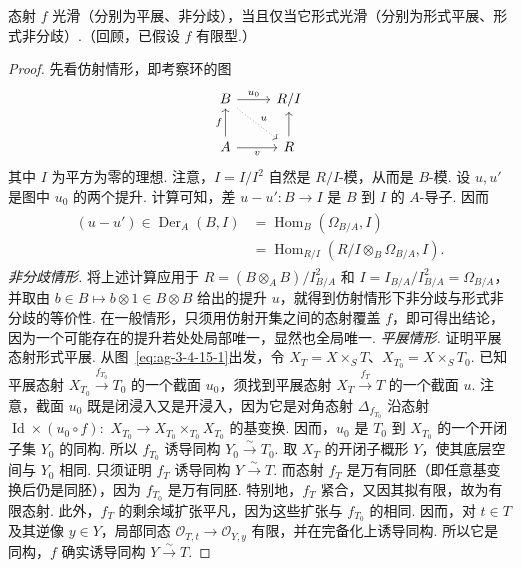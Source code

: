\begin{theorem}\label{item:ag-3-4-16}
态射 $f$ 光滑（分别为平展、非分歧），当且仅当它形式光滑（分别为形式平展、形式非分歧）.（回顾，已假设 $f$ 有限型.）
\end{theorem}
\begin{proof}
先看仿射情形，即考察环的图
\begin{align*}
\begin{tikzcd}[ampersand replacement=\&]
B\arrow[r,"u_0"]\arrow[dr,dotted,"u"] \& R/I\\
A\arrow[u,"f"]\arrow[r,"v"'] \& R\arrow[u]
\end{tikzcd}
\end{align*}
其中 $I$ 为平方为零的理想. 注意，$I=I/I^2$ 自然是 $R/I$-模，从而是 $B$-模. 设 $u,u'$ 是图中 $u_0$ 的两个提升. 计算可知，差 $u-u':B\longrightarrow I$ 是 $B$ 到 $I$ 的 $A$-导子. 因而
\begin{align}
\begin{aligned}
(u-u')\in\operatorname{Der}_A(B,I)&=\operatorname{Hom}_B(\Omega_{B/A},I)\\
&=\operatorname{Hom}_{R/I}(R/I\otimes_B\Omega_{B/A},I).
\end{aligned}\tag{3.4.16.2}\label{eq:ag-3-4-16-2}
\end{align}
\emph{非分歧情形.} 将上述计算应用于 $R=(B\otimes_AB)/I_{B/A}^2$ 和 $I=I_{B/A}/I_{B/A}^2=\Omega_{B/A}$，并取由 $b\in B\mapsto b\otimes1\in B\otimes B$ 给出的提升 $u$，就得到仿射情形下非分歧与形式非分歧的等价性. 在一般情形，只须用仿射开集之间的态射覆盖 $f$，即可得出结论，因为一个可能存在的提升若处处局部唯一，显然也全局唯一.
\emph{平展情形.} 证明平展态射形式平展. 从图~\eqref{eq:ag-3-4-15-1}出发，令 $X_T=X\times_ST$、$X_{T_0}=X\times_ST_0$. 已知平展态射 $X_{T_0}\xrightarrow{f_{T_0}}T_0$ 的一个截面 $u_0$，须找到平展态射 $X_T\xrightarrow{f_T}T$ 的一个截面 $u$. 注意，截面 $u_0$ 既是闭浸入又是开浸入，因为它是对角态射 $\Delta_{f_{T_0}}$ 沿态射 $\operatorname{Id}\times(u_0\circ f):$
$X_{T_0}\longrightarrow X_{T_0}\times_{T_0}X_{T_0}$ 的基变换. 因而，$u_0$ 是 $T_0$ 到 $X_{T_0}$ 的一个开闭子集 $Y_0$ 的同构. 所以 $f_{T_0}$ 诱导同构 $Y_0\xrightarrow\sim T_0$. 取 $X_T$ 的开闭子概形 $Y$，使其底层空间与 $Y_0$ 相同. 只须证明 $f_T$ 诱导同构 $Y\xrightarrow\sim T$. 而态射 $f_T$ 是万有同胚（即任意基变换后仍是同胚），因为 $f_{T_0}$ 是万有同胚. 特别地，$f_T$ 紧合，又因其拟有限，故为有限态射. 此外，$f_T$ 的剩余域扩张平凡，因为这些扩张与 $f_{T_0}$ 的相同. 因而，对 $t\in T$ 及其逆像 $y\in Y$，局部同态 $\mathcal O_{T,t}\longrightarrow\mathcal O_{Y,y}$ 有限，并在完备化上诱导同构. 所以它是同构，$f$ 确实诱导同构 $Y\xrightarrow\sim T$.

\end{proof}
